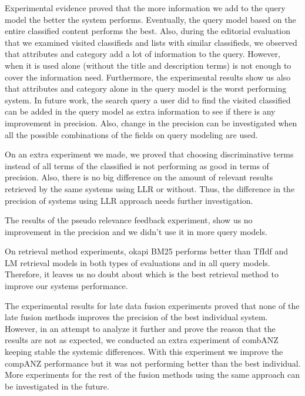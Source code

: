 Experimental evidence proved that the more information we add to the query model the better the system performs. Eventually, the query model based on the entire classified content performs the best. Also, during the editorial evaluation that we examined visited classifieds and lists with similar classifieds, we observed that attributes and category add a lot of information to the query. However, when it is used alone (without the title and description terms) is not enough to cover the information need. Furthermore, the experimental results show us also that attributes and category alone in the query model is the worst performing system. In future work, the search query a user did to find the visited classified can be added in the query model as extra information to see if there is any improvement in precision. Also, change in the precision can be investigated when all the possible combinations of the fields on query modeling are used.



On an extra experiment we made, we proved that choosing discriminative terms instead of all terms of the classified is not performing as good in terms of precision. Also, there is no big difference on the amount of relevant results retrieved by the same systems using LLR or without. Thus, the difference in the precision of systems using LLR approach needs further investigation.

The results of the pseudo relevance feedback experiment, show us no improvement in the precision and we didn't use it in more query models.

On retrieval method experiments, okapi BM25 performs better than TfIdf and LM retrieval models in both types of evaluations and in all query models. Therefore, it leaves us no doubt about which is the best retrieval method to improve our systems performance.

The experimental results for late data fusion experiments proved that none of the late fusion methods improves the precision of the best individual system. However, in an attempt to analyze it further and prove the reason that the results are not as expected, we conducted an extra experiment of combANZ keeping stable the systemic differences. With this experiment we improve the compANZ performance but it was not performing better than the best individual. More experiments for the rest of the fusion methods using the same approach can be investigated in the future.

